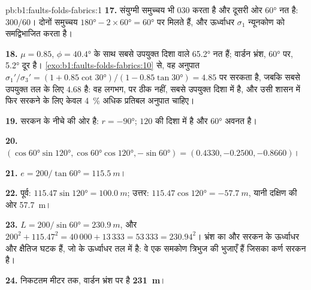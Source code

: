 \begin{solution}{pb:b1:faults-folds-fabrics:1}
\textbf{17.} संयुग्मी समुच्चय भी $030$  करता है और दूसरी ओर \ang{60} नत है:
$300/60$। दोनों समुच्चय $\ang{180} - 2\times\ang{60} = \ang{60}$ पर मिलते हैं, और
ऊर्ध्वाधर $\sigma_1$ न्यूनकोण को समद्विभाजित करता है।

\textbf{18.} $\mu = 0.85$, $\phi = \ang{40.4}$ के साथ सबसे उपयुक्त दिशा वाले  \ang{65.2} नत हैं; वार्डन भ्रंश, \ang{60} पर, \ang{5.2} दूर है।
\cref{exo:b1:faults-folds-fabrics:10} से, वह अनुपात $\sigma_1'/\sigma_3' = (1 + 0.85\cot\ang{30})/(1 - 0.85\tan\ang{30}) = 4.85$
पर सरकता है, जबकि सबसे उपयुक्त तल के लिए $4.68$ है: वह लगभग, पर ठीक नहीं, सबसे उपयुक्त दिशा में है, और उसी शासन में फिर सरकने के लिए केवल \qty{4}{\percent} अधिक प्रतिबल अनुपात चाहिए।

\textbf{19.} सरकन  के नीचे की ओर है: $r = \ang{-90}$; 
$120$ की दिशा में है और \ang{60} अवनत है।

\textbf{20.} $(\cos\ang{60}\sin\ang{120}, \cos\ang{60}\cos\ang{120},
-\sin\ang{60}) = (0.4330, -0.2500, -0.8660)$।

\textbf{21.} $e = 200/\tan\ang{60} = \qty{115.5}{m}$।

\textbf{22.} पूर्व: $115.47\sin\ang{120} = \qty{100.0}{m}$; उत्तर:
$115.47\cos\ang{120} = \qty{-57.7}{m}$, यानी दक्षिण की ओर \qty{57.7}{m}।

\textbf{23.} $L = 200/\sin\ang{60} = \qty{230.9}{m}$, और
$200^2 + 115.47^2 = 40\,000 + 13\,333 = 53\,333 = 230.94^2$। भ्रंश का  और
 सरकन के ऊर्ध्वाधर और क्षैतिज घटक हैं, जो  के ऊर्ध्वाधर तल में
है: वे एक समकोण त्रिभुज की भुजाएँ हैं जिसका कर्ण सरकन है।

\textbf{24.} निकटतम मीटर तक, वार्डन भ्रंश पर  है
\textbf{\qty[text-series-to-math=true]{231}{m}}।
\end{solution}
